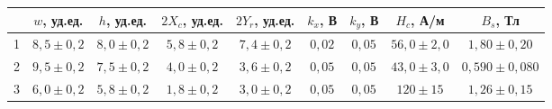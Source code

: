 \begin{tabular}{ccccccccc}
\toprule
 & $w$, уд.ед. & $h$, уд.ед. & $2X_c$, уд.ед. & $2Y_r$, уд.ед. & $k_x$, В & $k_y$, В & $H_c$, А/м & $B_s$, Тл \\
\midrule
1 & $8,5 \pm 0,2$ & $8,0 \pm 0,2$ & $5,8 \pm 0,2$ & $7,4 \pm 0,2$ & $0,02$ & $0,05$ & $56,0 \pm 2,0$ & $1,80 \pm 0,20$ \\
2 & $9,5 \pm 0,2$ & $7,5 \pm 0,2$ & $4,0 \pm 0,2$ & $3,6 \pm 0,2$ & $0,05$ & $0,05$ & $43,0 \pm 3,0$ & $0,590 \pm 0,080$ \\
3 & $6,0 \pm 0,2$ & $5,8 \pm 0,2$ & $1,8 \pm 0,2$ & $3,0 \pm 0,2$ & $0,05$ & $0,05$ & $120 \pm 15$ & $1,26 \pm 0,15$ \\
\bottomrule
\end{tabular}